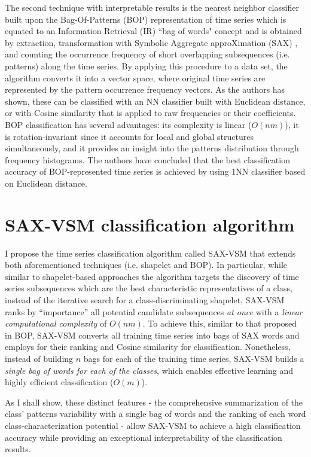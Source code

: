 The second technique with interpretable results is the nearest neighbor classifier built upon the Bag-Of-Patterns (BOP) representation of 
time series \cite{citeulike:10525778} which is equated to an Information Retrieval (IR) ``bag of words" concept and is obtained by extraction, 
transformation with Symbolic Aggregate approXimation (SAX) \cite{sax}, and counting the occurrence frequency of short overlapping 
subsequences (i.e. patterns) along the time series.
By applying this procedure to a data set, the algorithm converts it into a vector space, where original time series are 
represented by the pattern occurrence frequency vectors. As the authors has shown, these can be classified with an NN classifier 
built with Euclidean distance, or with Cosine similarity that is applied to raw frequencies or their \tfidf coefficients. 
BOP classification has several advantages: its complexity is linear ($O(nm)$), it is rotation-invariant since it accounts for local and 
global structures simultaneously, and it provides an insight into the patterns distribution through frequency histograms.
The authors have concluded that the best classification accuracy of BOP-represented time series is achieved by using 1NN classifier 
based on Euclidean distance. 

\section{SAX-VSM classification algorithm} \label{sax_vsm_background}
I propose the time series classification algorithm called \mbox{SAX-VSM} that extends both aforementioned techniques (i.e. shapelet and BOP). 
In particular, while similar to shapelet-based approaches the algorithm targets the discovery of time series subsequences which 
are the best characteristic representatives of a class, 
instead of the iterative search for a class-discriminating shapelet, \mbox{SAX-VSM} ranks by “importance” all potential candidate 
subsequences \textit{at once} with a \textit{linear computational complexity} of $O(nm)$.
To achieve this, similar to that proposed in BOP, \mbox{SAX-VSM} converts all training time series into bags of SAX 
words and employs \tfidf for their ranking and Cosine similarity for classification. 
Nonetheless, instead of building $n$ bags for each of the training time series, SAX-VSM builds a 
\textit{single bag of words for each of the classes}, which enables effective learning and highly efficient classification ($O(m)$).

As I shall show, these distinct features - the comprehensive summarization of the class' patterns variability with a single bag 
of words and the ranking of each word class-characterization potential - allow SAX-VSM to achieve a high classification accuracy
while providing an exceptional interpretability of the classification results.

